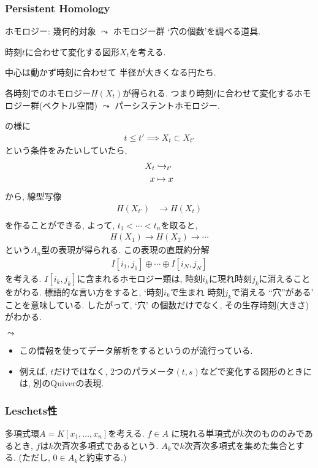 \subsubsection{Persistent Homology}
ホモロジー:
幾何的対象 $\leadsto$ ホモロジー群
\ZU
`穴の個数'を調べる道具.



時刻$t$に合わせて変化する図形$X_t$を考える.
\begin{example}
  \label{ex:fundex:ph}
\ZU
中心は動かず時刻に合わせて
半径が大きくなる円たち.
\end{example}

各時刻でのホモロジー$H(X_t)$が得られる.
つまり時刻$t$に合わせて変化するホモロジー群(ベクトル空間)
$\leadsto$ パーシステントホモロジー.

の様に
\begin{align*}
  t\leq t' \implies X_t \subset X_{t'}
\end{align*}
という条件をみたいしていたら,
\begin{align*}
  X_t&\injectto X_{t'}\\
  x&\mapsto x
\end{align*}
から, 線型写像
\begin{align*}
  H(X_{t'})&\to H(X_t)\\
\end{align*}
を作ることができる,
よって,
$t_1<\cdots <t_n$を取ると,
\begin{align*}
  H(X_1)\to H(X_2)\to\cdots
\end{align*}
という$A_n$型の表現が得られる.
この表現の直既約分解
\begin{align*}
  I[i_1,j_1]\oplus \cdots\oplus I[i_N,j_N]
\end{align*}
を考える.
$I[i_k,j_k]$に含まれるホモロジー類は,
時刻$i_k$に現れ時刻$j_k$に消えることをがわる.
標語的な言い方をすると,
`時刻$i_k$で生まれ
時刻$j_k$で消える
``穴''がある'
ことを意味している.
したがって,
`穴' の個数だけでなく,
その生存時刻(大きさ)がわかる.

$\leadsto$
\begin{itemize}
\item
  この情報を使ってデータ解析をするというのが流行っている.
\item
  例えば, $t$だけではなく,
  2つのパラメータ$(t,s)$などで変化する図形のときには,
  別のQuiverの表現.
\end{itemize}


\subsubsection{Leschets性}
多項式環$A=K[x_1,\ldots,x_n]$を考える.
$f\in A$ 
に現れる単項式が$k$次のもののみであるとき,
$f$は$k$次斉次多項式であるという.
$A_k$で$k$次斉次多項式を集めた集合とする.
(ただし, $0\in A_k$と約束する.)

